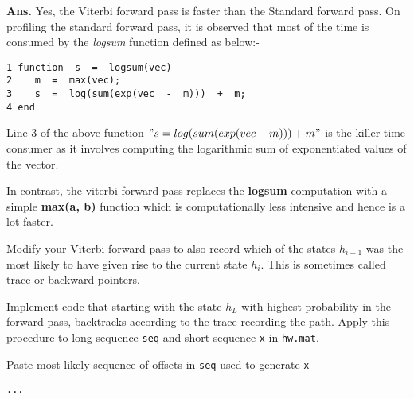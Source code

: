 \documentclass{article}
\begin{document}
\vspace{2mm}

\textbf{Ans.} Yes, the Viterbi forward pass is faster than the Standard forward pass. On profiling the standard forward pass, it is observed that most of the time is consumed by the \textit{logsum} function defined as below:-
\begin{verbatim}
1 function  s  =  logsum(vec)
2    m  =  max(vec);
3    s  =  log(sum(exp(vec  -  m)))  +  m;
4 end
\end{verbatim}

Line 3 of the above function $"s  =  log(sum(exp(vec  -  m)))  +  m"$ is the killer time consumer as it involves computing the logarithmic sum of exponentiated values of the vector.

In contrast, the viterbi forward pass replaces the \textbf{logsum} computation with a simple \textbf{max(a, b)} function which is computationally less intensive and hence is a lot faster.

\vspace{2mm}

\newproblem{3pt} Modify your Viterbi forward pass to also record which of the states  $h_{i-1}$ was the most likely to have given rise to the current state $h_{i}$. This is sometimes called trace or backward pointers.

Implement code that starting with the state $h_L$ with highest probability in the forward pass, backtracks according to the trace recording the path. Apply this procedure to long sequence {\tt seq} and short sequence {\tt x} in {\tt hw\theHW.mat}.

Paste most likely sequence of offsets in {\tt seq} used to generate {\tt x}
\begin{verbatim}
...
\end{verbatim}
\end{document}
